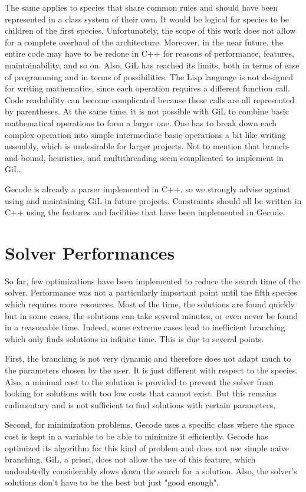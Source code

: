 The same applies to species that share common rules and should have been represented in a class system of their own. It would be logical for species to be children of the first species. Unfortunately, the scope of this work does not allow for a complete overhaul of the architecture. Moreover, in the near future, the entire code may have to be redone in C++ for reasons of performance, features, maintainability, and so on. Also, GiL has reached its limits, both in terms of ease of programming and in terms of possibilities. The Lisp language is not designed for writing mathematics, since each operation requires a different function call. Code readability can become complicated because these calls are all represented by parentheses. At the same time, it is not possible with GiL to combine basic mathematical operations to form a larger one. One has to break down each complex operation into simple intermediate basic operations a bit like writing assembly, which is undesirable for larger projects. Not to mention that branch-and-bound, heuristics, and multithreading seem complicated to implement in GiL.

Gecode is already a parser implemented in C++, so we strongly advise against using and maintaining GiL in future projects. Constraints should all be written in C++ using the features and facilities that have been implemented in Gecode.

\section{Solver Performances}
So far, few optimizations have been implemented to reduce the search time of the solver. Performance was not a particularly important point until the fifth species which requires more resources. Most of the time, the solutions are found quickly but in some cases, the solutions can take several minutes, or even never be found in a reasonable time. Indeed, some extreme cases lead to inefficient branching which only finds solutions in infinite time. This is due to several points.

First, the branching is not very dynamic and therefore does not adapt much to the parameters chosen by the user. It is just different with respect to the species. Also, a minimal cost to the solution is provided to prevent the solver from looking for solutions with too low costs that cannot exist. But this remains rudimentary and is not sufficient to find solutions with certain parameters.

Second, for minimization problems, Gecode uses a specific class where the space cost is kept in a variable to be able to minimize it efficiently. Gecode has optimized its algorithm for this kind of problem and does not use simple naive branching. GiL, a priori, does not allow the use of this feature, which undoubtedly considerably slows down the search for a solution. Also, the solver's solutions don't have to be the best but just "good enough".

